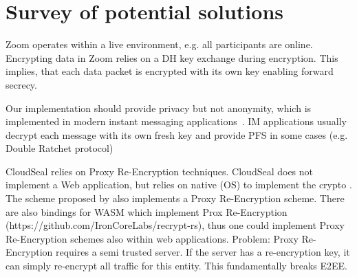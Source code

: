 \documentclass[../main.tex]{subfiles}
\begin{document}
\chapter{Survey of potential solutions}


Zoom operates within a live environment, e.g. all participants are online. 
Encrypting data in Zoom relies on a DH key exchange during encryption. 
This implies, that each data packet is encrypted with its own key enabling forward secrecy. \cite{Isobe2021}

Our implementation should provide privacy but not anonymity, which is implemented in modern instant messaging applications~\cite{Akinbi2021}. 
IM applications usually decrypt each message with its own fresh key and provide PFS in some cases (e.g. Double Ratchet protocol)

CloudSeal relies on Proxy Re-Encryption techniques.
CloudSeal does not implement a Web application, but relies on native (OS) to implement the crypto \cite{Xiong2012}.
The scheme proposed by \citeauthor{Hoerandner2020} also implements a Proxy Re-Encryption scheme. \cite{Hoerandner2020}
There are also bindings for WASM which implement Prox Re-Encryption (https://github.com/IronCoreLabs/recrypt-rs), thus one could implement Proxy Re-Encryption schemes also within web applications.
Problem: Proxy Re-Encryption requires a semi trusted server.
If the server has a re-encryption key, it can simply re-encrypt all traffic for this entity.
This fundamentally breaks E2EE.
\end{document}
